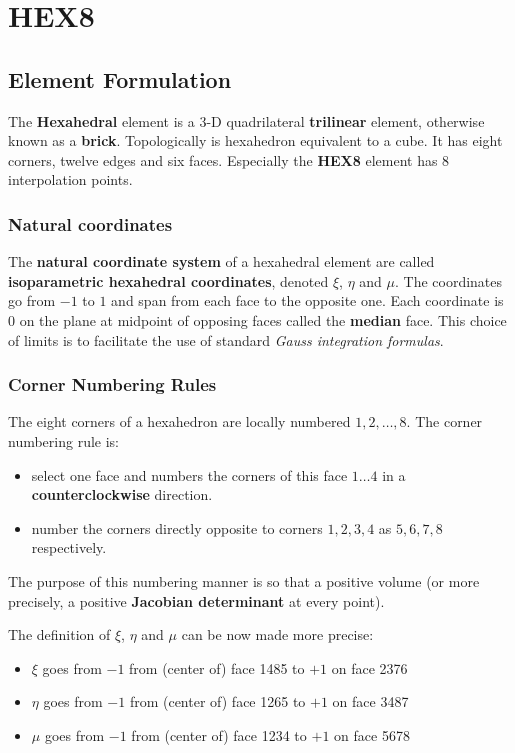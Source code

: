 \documentclass[10pt,b5paper,titlepage]{book}
\begin{document}
\newpage
\section{HEX8}

\subsection{Element Formulation}

The \textbf{Hexahedral} element is a 3-D quadrilateral \textbf{trilinear}
element, otherwise known as a \textbf{brick}. Topologically is hexahedron
equivalent to a cube. It has eight corners, twelve edges and six faces.
Especially the \textbf{HEX8} element has 8 interpolation points.

\subsubsection{Natural coordinates}
The \textbf{natural coordinate system} of a hexahedral element are called
\textbf{isoparametric hexahedral coordinates}, denoted $ \xi $, $ \eta $ and $ \mu $.
The coordinates go from $ -1 $ to $ 1 $ and span from each face to the opposite one.
Each coordinate is 0 on the plane at midpoint of opposing faces called the
\textbf{median} face. This choice of limits is to facilitate the use of standard
\textit{Gauss integration formulas}.

\subsubsection{Corner Numbering Rules}
The eight corners of a hexahedron are locally numbered $ 1, 2, \dots , 8 $.
The corner numbering rule is:

\begin{itemize}
    \item select one face and numbers the corners of this face $ 1 \dots 4 $
          in a \textbf{counterclockwise} direction.
    \item number the corners directly opposite to corners $ 1, 2, 3, 4 $ as
          $ 5, 6, 7, 8 $ respectively.
\end{itemize}

The purpose of this numbering manner is so that a positive volume (or more
precisely, a positive \textbf{Jacobian determinant} at every point).

The definition of $ \xi $, $ \eta $ and $ \mu $ can be now made more precise:

\begin{itemize}
    \item $ \xi $ goes from $ -1 $ from (center of) face 1485 to $ +1 $ on face 2376
    \item $ \eta $ goes from $ -1 $ from (center of) face 1265 to $ +1 $ on face 3487
    \item $ \mu $ goes from $ -1 $ from (center of) face 1234 to $ +1 $ on face 5678
\end{itemize}
\end{document}
